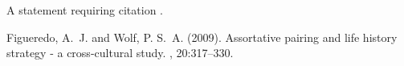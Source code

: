 \documentclass[twoside]{article}
\begin{document}
A statement requiring citation \cite{Figueredo:2009dg}.
\blindtext %



\begin{thebibliography}{99} %

Figueredo, A.~J. and Wolf, P. S.~A. (2009).
\newblock Assortative pairing and life history strategy - a cross-cultural
  study.
, 20:317--330.
 
\end{thebibliography}

\end{document}
